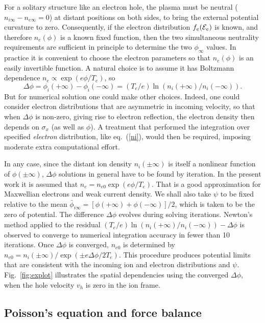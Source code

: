 \documentclass[pre]{revtex4-2}
\def\energy{{\cal E}}
\begin{document}
For a solitary structure like an electron hole, the plasma must be
neutral ($n_{i\infty}-n_{e\infty}=0$) at distant positions
on both sides, to bring the external potential curvature to
zero. Consequently, if the electron distribution $f_e(\energy_e)$ is
known, and therefore $n_e(\phi)$ is a known fixed function, then the
two simultaneous neutrality requirements are sufficient in principle
to determine the two $\phi_\infty$ values. In practice it is
convenient to choose the electron parameters so that $n_e(\phi)$ is an
easily invertible function. A natural choice is to assume it has
Boltzmann dependence $n_e\propto \exp(e\phi/T_e)$, so
\begin{equation}\label{fedist}
\Delta \phi=\phi_{i}(+\infty)-\phi_i(-\infty)=
(T_e/e)\ln(n_i(+\infty)/n_i(-\infty)).  
\end{equation}
But for numerical solution one could make other choices. Indeed, one
could consider electron distributions that are asymmetric in incoming
velocity, so that when $\Delta\phi$ is non-zero, giving rise to
electron reflection, the electron density then depends on $\sigma_x$ (as
well as $\phi$). A treatment that performed the integration over
specified \emph{electron} distribution, like eq.\ (\ref{ni}), would
then be required, imposing moderate extra computational effort.

In any case, since the distant ion density $n_i(\pm\infty)$ is itself
a nonlinear function of $\phi(\pm\infty)$, $\Delta\phi$ solutions in
general have to be found by iteration. In the present work it is
assumed that $n_e=n_{e0}\exp(e\phi/T_e)$. That is a good approximation
for Maxwellian electrons and weak current density. We shall also take
$\psi$ to be fixed relative to the mean
$\bar\phi_{i\infty}=[\phi(+\infty)+\phi(-\infty)]/2$, which is taken
to be the zero of potential. The difference $\Delta\phi$ evolves
during solving iterations. Newton's method applied to the residual
$(T_e/e)\ln(n_i(+\infty)/n_i(-\infty))-\Delta\phi$ is observed to
converge to numerical integration accuracy in fewer than
10 iterations. Once $\Delta\phi$ is converged, $n_{e0}$ is determined
by $n_{e0}=n_i(\pm\infty)/\exp(\pm e\Delta\phi/2T_e)$.  This procedure
produces potential limits that are consistent with the incoming ion
and electron distributions and $\psi$. Fig.\ \ref{fig:explot}
illustrates the spatial dependencies using the converged
$\Delta\phi$, when the hole velocity $v_h$ is zero in the ion frame.


\subsection{Poisson's equation and force balance}
\end{document}
